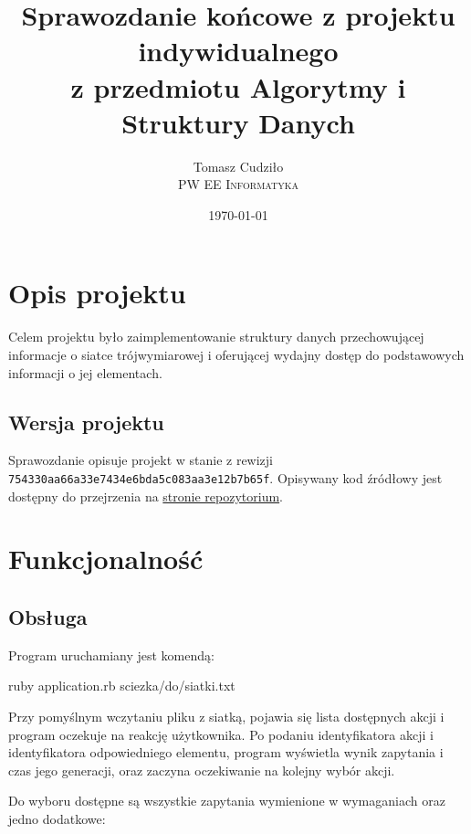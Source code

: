 \documentclass[10pt,a4paper]{article}
\newcommand{\f}[1]{\texttt{#1}}
\newcommand{\rev}{754330aa66a33e7434e6bda5c083aa3e12b7b65f}
\begin{document}
\title{
  Sprawozdanie końcowe z projektu indywidualnego\\
  z przedmiotu Algorytmy i Struktury Danych
}
\author{
  Tomasz Cudziło\\
  \textsc{PW EE Informatyka}\\[7pt]
}
\date{\today}
\maketitle



\section{Opis projektu}

Celem projektu było zaimplementowanie struktury danych przechowującej informacje
o siatce trójwymiarowej i oferującej wydajny dostęp do podstawowych informacji o
jej elementach.

\subsection{Wersja projektu}

Sprawozdanie opisuje projekt w stanie z rewizji \f{\rev}. Opisywany kod źródłowy
jest dostępny do przejrzenia na
\href{https://github.com/student-tomasz/aisd-projekt-indywidualny/tree/\rev}{stronie repozytorium}.



\section{Funkcjonalność}


\subsection{Obsługa}

Program uruchamiany jest komendą:
\begin{SmallVerbatim}
    ruby application.rb sciezka/do/siatki.txt
\end{SmallVerbatim}

Przy pomyślnym wczytaniu pliku z siatką, pojawia się lista dostępnych akcji i
program oczekuje na reakcję użytkownika. Po podaniu identyfikatora akcji i
identyfikatora odpowiedniego elementu, program wyświetla wynik zapytania i
czas jego generacji, oraz zaczyna oczekiwanie na kolejny wybór akcji.

Do wyboru dostępne są wszystkie zapytania wymienione w wymaganiach oraz jedno
dodatkowe: \vspace{10pt}
\end{document}
